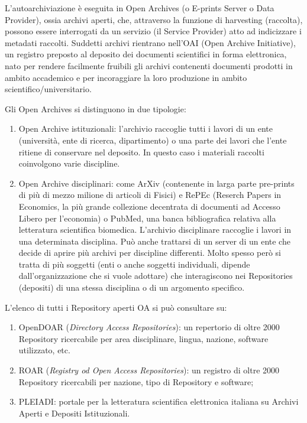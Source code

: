 \documentclass[
  b5paper,
  twoside,
  12pt,
  chapterprefix=false,
  bibliography=totocnumbered,
  parskip=false]{scrbook}
\begin{document}
L'autoarchiviazione è eseguita in Open Archives (o E-prints Server o
Data Provider), ossia archivi aperti, che, attraverso la funzione di
harvesting (raccolta), possono essere interrogati da un servizio (il
Service Provider) atto ad indicizzare i metadati raccolti. Suddetti
archivi rientrano nell'OAI (Open Archive Initiative), un registro
preposto al deposito dei documenti scientifici in forma elettronica,
nato per rendere facilmente fruibili gli archivi contenenti documenti
prodotti in ambito accademico e per incoraggiare la loro produzione in
ambito scientifico/universitario.

Gli Open Archives si distinguono in due tipologie:

\begin{enumerate}
\def\labelenumi{\arabic{enumi}.}
\item
  Open Archive istituzionali: l'archivio raccoglie tutti i lavori di
  un ente (università, ente di ricerca, dipartimento) o una parte dei
  lavori che l'ente ritiene di conservare nel deposito. In questo caso
  i materiali raccolti coinvolgono varie discipline.
\item
  Open Archive disciplinari: come ArXiv (contenente in larga parte
  pre-prints di più di mezzo milione di articoli di Fisici) e RePEc
  (Reserch Papers in Economics, la più grande collezione decentrata di
  documenti ad Accesso Libero per l'economia) o PubMed, una banca
  bibliografica relativa alla letteratura scientifica biomedica.
  L'archivio disciplinare raccoglie i lavori in una determinata
  disciplina. Può anche trattarsi di un server di un ente che decide
  di aprire più archivi per discipline differenti. Molto spesso però
  si tratta di più soggetti (enti o anche soggetti individuali,
  dipende dall'organizzazione che si vuole adottare) che interagiscono
  nei Repositories (depositi) di una stessa disciplina o di un
  argomento specifico.
\end{enumerate}

L'elenco di tutti i Repository aperti OA si può consultare su:

\begin{enumerate}
\def\labelenumi{\arabic{enumi}.}
\item
  OpenDOAR (\emph{Directory Access Repositories}): un repertorio di oltre
  2000 Repository ricercabile per area disciplinare, lingua, nazione,
  software utilizzato, etc.
\item
  ROAR (\emph{Registry od Open Access Repositories}): un registro di oltre
  2000 Repository ricercabili per nazione, tipo di Repository e
  software;
\item
  PLEIADI: portale per la letteratura scientifica elettronica italiana
  su Archivi Aperti e Depositi Istituzionali.
\end{enumerate}
\end{document}
